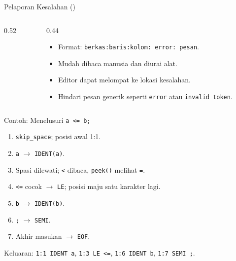 \documentclass[aspectratio=169,10pt,t]{beamer}
\begin{document}
\begin{frame}[fragile]{Pelaporan Kesalahan ()}
  \begin{columns}[T,onlytextwidth]
    \begin{column}{0.52\textwidth}
      
    \end{column}
    \begin{column}{0.44\textwidth}
      \begin{itemize}
        \item Format: \texttt{berkas:baris:kolom: error: pesan}.
        \item Mudah dibaca manusia dan diurai alat.
        \item Editor dapat melompat ke lokasi kesalahan.
        \item Hindari pesan generik seperti \texttt{error} atau
              \texttt{invalid token}.
      \end{itemize}
    \end{column}
  \end{columns}
\end{frame}

\begin{frame}{Contoh: Menelusuri \texttt{a <= b;}}
  \small
  \begin{enumerate}
    \setlength{\itemsep}{2pt}
    \item \texttt{skip\_space}; posisi awal 1:1.
    \item \texttt{a} $\rightarrow$ \texttt{IDENT(a)}.
    \item Spasi dilewati; \texttt{<} dibaca, \texttt{peek()} melihat
          \texttt{=}.
    \item \texttt{<=} cocok $\rightarrow$ \texttt{LE}; posisi maju satu
          karakter lagi.
    \item \texttt{b} $\rightarrow$ \texttt{IDENT(b)}.
    \item \texttt{;} $\rightarrow$ \texttt{SEMI}.
    \item Akhir masukan $\rightarrow$ \texttt{EOF}.
  \end{enumerate}

  \vspace{2pt}
  {\footnotesize\color{ubbblue!80}Keluaran:
  \texttt{1:1 IDENT a}, \texttt{1:3 LE <=}, \texttt{1:6 IDENT b},
  \texttt{1:7 SEMI ;}.}
\end{frame}
\end{document}
